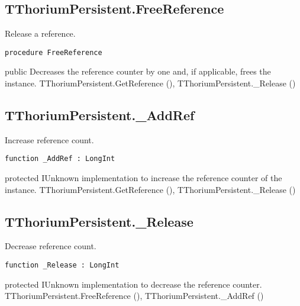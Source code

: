 \subsection{TThoriumPersistent.FreeReference}
\label{thoriumcorepkg:thorium:tthoriumpersistent:freereference}
\begin{FPCList}
\Synopsis
Release a reference.\Declaration 

\begin{verbatim}
procedure FreeReference
\end{verbatim}
\Visibility
public
\Description
Decreases the reference counter by one and, if applicable, frees the instance.\SeeAlso
TThoriumPersistent.GetReference (\pageref{thoriumcorepkg:thorium:tthoriumpersistent:getreference}),
TThoriumPersistent.\_Release (\pageref{thoriumcorepkg:thorium:tthoriumpersistent:release})\end{FPCList}
\subsection{TThoriumPersistent.\_AddRef}
\label{thoriumcorepkg:thorium:tthoriumpersistent:addref}
\begin{FPCList}
\Synopsis
Increase reference count.\Declaration 

\begin{verbatim}
function _AddRef : LongInt
\end{verbatim}
\Visibility
protected
\Description
IUnknown implementation to increase the reference counter of the instance.\SeeAlso
TThoriumPersistent.GetReference (\pageref{thoriumcorepkg:thorium:tthoriumpersistent:getreference}),
TThoriumPersistent.\_Release (\pageref{thoriumcorepkg:thorium:tthoriumpersistent:release})\end{FPCList}
\subsection{TThoriumPersistent.\_Release}
\label{thoriumcorepkg:thorium:tthoriumpersistent:release}
\begin{FPCList}
\Synopsis
Decrease reference count.\Declaration 

\begin{verbatim}
function _Release : LongInt
\end{verbatim}
\Visibility
protected
\Description
IUnknown implementation to decrease the reference counter.\SeeAlso
TThoriumPersistent.FreeReference (\pageref{thoriumcorepkg:thorium:tthoriumpersistent:freereference}),
TThoriumPersistent.\_AddRef (\pageref{thoriumcorepkg:thorium:tthoriumpersistent:addref})\end{FPCList}
